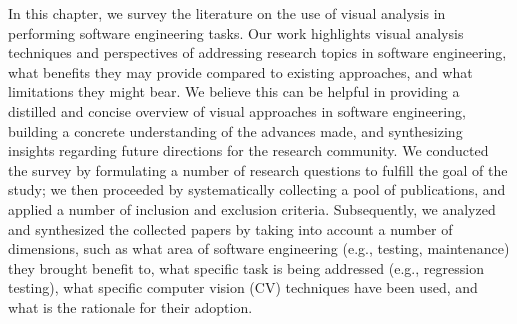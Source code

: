 In this chapter, we survey the literature on 
the use of visual analysis in performing 
software engineering tasks. 
Our work highlights visual analysis techniques and perspectives
of addressing research topics in software engineering,
what benefits they may provide compared to existing approaches,
and what limitations they might bear.
We believe this can be helpful in
providing a distilled and concise overview of 
visual approaches in software engineering, 
building a concrete understanding of the 
advances made, and synthesizing insights  
regarding future directions for the research community. 
We conducted the survey by formulating a number of
research questions to fulfill the goal of the study;
we then proceeded by systematically collecting
a pool of publications, and applied a number of
inclusion and exclusion criteria.
Subsequently, we analyzed and synthesized the collected papers
by taking into account a number of dimensions,
such as what area of software engineering (e.g., testing, maintenance)
they brought benefit to, 
what specific task is being addressed (e.g., regression testing),
what specific computer vision (CV) techniques have been used,
and what is the rationale for their adoption.


